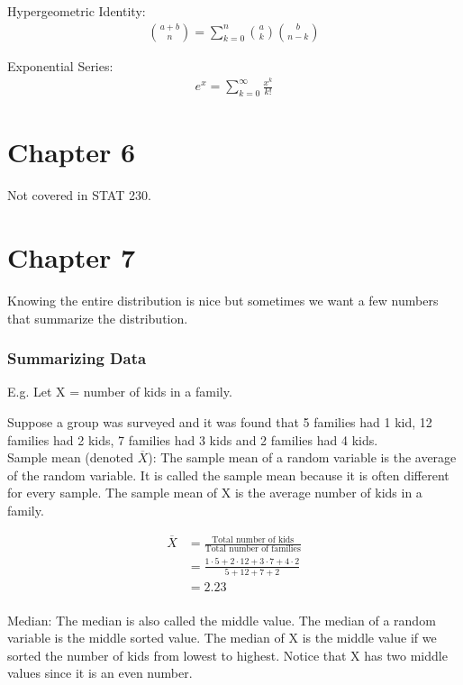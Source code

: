 \documentclass[12pt, letterpaper]{article}
\begin{document}
Hypergeometric Identity:
\begin{align*}
{{a + b} \choose {n}} = \sum_{k = 0}^{n} {{a} \choose {k}} {{b} \choose {n - k}}
\end{align*}

Exponential Series:
\begin{align*}
e^x = \sum_{k = 0}^{\infty} \frac{x^k}{k!}
\end{align*}

\newpage

\section{Chapter 6}
Not covered in STAT 230.

\newpage

\section{Chapter 7}
Knowing the entire distribution is nice but sometimes we want a few numbers that summarize the distribution.

\subsubsection{Summarizing Data}
E.g. Let X = number of kids in a family.

Suppose a group was surveyed and it was found that 5 families had 1 kid, 12 families had 2 kids, 7 families had 3 kids and 2 families had 4 kids.\\

Sample mean (denoted \(\overline{X}\)): The sample mean of a random variable is the average of the random variable. It is called the sample mean because it is often different for every sample. The sample mean of X is the average number of kids in a family.

\begin{align*}
\overline{X} &= \frac{\text{Total number of kids}}{\text{Total number of families}}\\
&= \frac{1 \cdot 5 + 2 \cdot 12 + 3 \cdot 7 + 4 \cdot 2 }{5 + 12 + 7 + 2}\\
&= 2.23
\end{align*}\\

Median: The median is also called the middle value. The median of a random variable is the middle sorted value. The median of X is the middle value if we sorted the number of kids from lowest to highest. Notice that X has two middle values since it is an even number.
\end{document}
